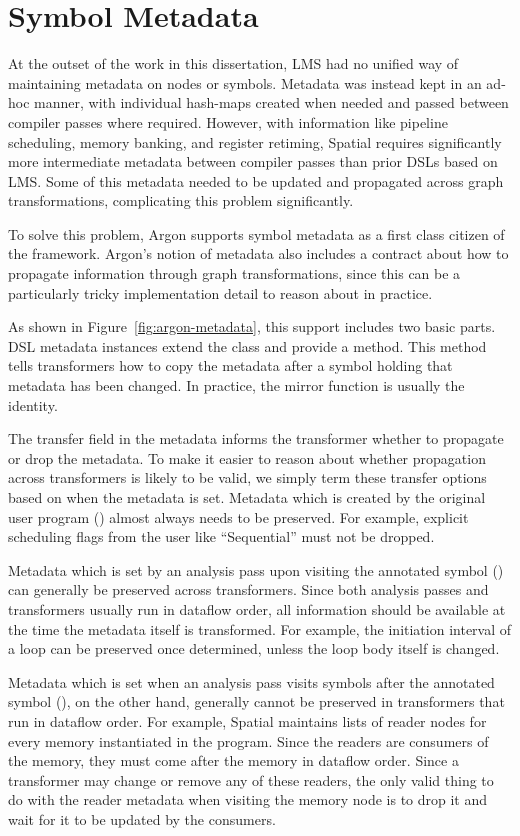 \section{Symbol Metadata}
At the outset of the work in this dissertation, LMS had no unified way of maintaining
metadata on nodes or symbols. Metadata was instead kept in an ad-hoc manner, with
individual hash-maps created when needed and passed between compiler passes
where required. However, with
information like pipeline scheduling, memory banking, and register retiming,
Spatial requires significantly more intermediate metadata between compiler passes
than prior DSLs based on LMS. Some of this metadata needed to be updated and
propagated across graph transformations, complicating this problem significantly.

To solve this problem, Argon supports symbol metadata as a first class citizen of the
framework. Argon's notion of metadata also includes a contract about how to
propagate information through graph transformations, since this can be a
particularly tricky implementation detail to reason about in practice.

As shown in Figure~\ref{fig:argon-metadata}, this support includes two basic parts.
DSL metadata instances extend the  class and provide a 
method. This method tells transformers how to copy the metadata after a symbol
holding that metadata has been changed. In practice, the mirror function is
usually the identity.

The transfer field in the metadata informs the transformer whether to
propagate or drop the metadata. To make it easier to reason about
whether propagation across transformers is likely to be valid, we simply
term these transfer options based on when the metadata is set.
Metadata which is created by the original user
program () almost always needs to be preserved. For example, explicit scheduling flags
from the user like ``Sequential'' must not be dropped.

Metadata which is set by an analysis pass upon visiting the annotated symbol () can
generally be preserved across transformers. Since both analysis passes and
transformers usually run in dataflow order, all information should be available
at the time the metadata itself is transformed. For example, the initiation
interval of a loop can be preserved once determined, unless the loop body
itself is changed.

Metadata which is set when an analysis pass visits symbols after the annotated symbol (),
on the other hand, generally cannot be preserved in transformers that run in
dataflow order. For example, Spatial maintains lists of reader nodes for every
memory instantiated in the program. Since the readers are consumers of the memory,
they must come after the memory in dataflow order. Since a transformer may change
or remove any of these readers, the only valid thing to do with the reader metadata
when visiting the memory node is to drop it and wait for it to be updated by the consumers.

